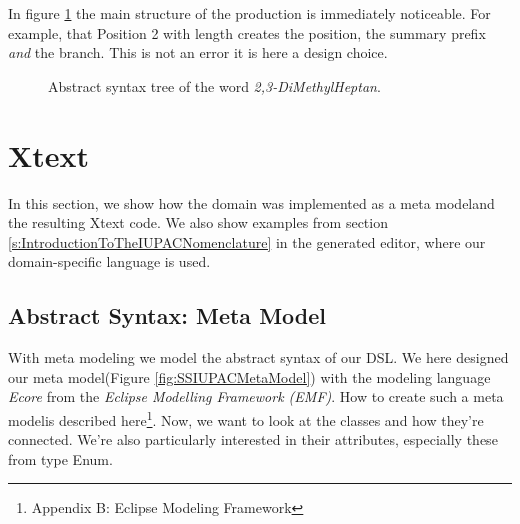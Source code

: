 \documentclass[
fontsize=11pt,
paper=a4,
abstract=true,
numbers=noenddot,
listof=totoc,
bibliography=totoc,
twoside,
open=right,
cleardoublepage=plain,
parskip=half+, %
BCOR=1cm, %
]{scrreprt}
\newcommand{\gerquot}[1]{\glqq#1\grqq}
\newcommand{\dashAndSpace}{\textendash \space}
\newcommand{\metamodel}{meta model}
\begin{document}

In figure \ref{fig:AbstractSyntaxTreeExample} the main structure of the production  is immediately noticeable. For example, that \gerquot{Position 2 with length} creates the position, the summary prefix \emph{and} the branch. This is not an error \dashAndSpace it is here a design choice.

\newcommand{\colorASTNode}{blue!15}
\newcommand{\colorASTNodeAtTheEnd}{green!40}
\begin{figure}[H]
\centering
\caption{Abstract syntax tree of the word \emph{2,3-DiMethylHeptan}.}
\label{fig:AbstractSyntaxTreeExample}
\end{figure}


\chapter{Xtext}\label{s:Xtext}
In this section, we show how the domain was implemented as a \metamodel\space and the resulting Xtext code. We also show examples from section \ref{s:IntroductionToTheIUPACNomenclature} in the generated editor, where our domain-specific language is used.  

\section{Abstract Syntax: Meta Model}\label{ss:AbstractSyntax:Metamodel}
With \metamodel ing we model the abstract syntax of our DSL. We here designed our \metamodel \space (Figure \ref{fig:SSIUPACMetaModel}) with the modeling language \emph{Ecore} from the \emph{Eclipse Modelling Framework (EMF)}. How to create such a \metamodel\space is described here\footnote{Appendix B: Eclipse Modeling Framework}. Now, we want to look at the classes and how they're connected. We're also particularly interested in their attributes, especially these from type Enum. 
\end{document}
